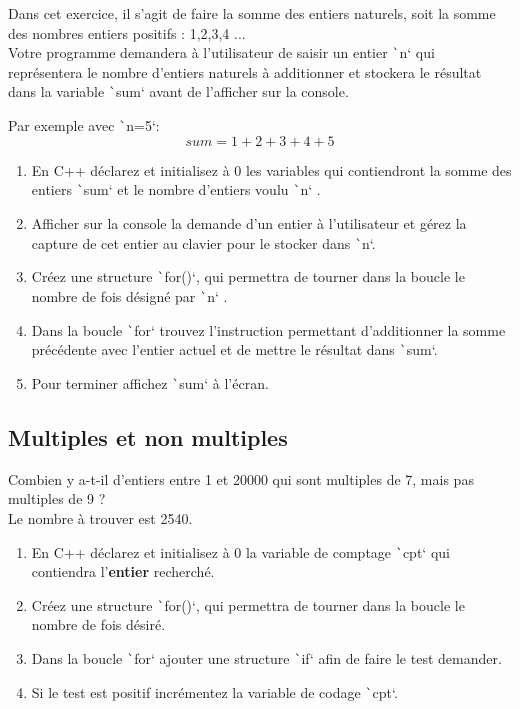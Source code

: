 \documentclass[10pt]{article}
\begin{document}
Dans cet exercice, il s'agit de faire la somme des entiers naturels, soit la somme des nombres entiers positifs : 1,2,3,4 ...\\
Votre programme demandera à l'utilisateur de saisir un entier \texttt`n` qui représentera le nombre d'entiers naturels à additionner et stockera le résultat dans la variable \texttt`sum` avant de l'afficher sur la console. 

\smallskip
Par exemple avec \texttt`n=5`:\\
$$sum=1+2+3+4+5$$

\begin{enumerate}
    \item En C++ déclarez et initialisez à 0 les variables qui contiendront la somme des entiers \texttt`sum` et le nombre d'entiers voulu \texttt`n` .
    \item Afficher sur la console la demande d'un entier à l'utilisateur et gérez la capture de cet entier au clavier pour le stocker dans \texttt`n`.
    \item Créez une structure \texttt`for()`, qui permettra de tourner dans la boucle le nombre de fois désigné par \texttt`n` .
    \item Dans la boucle \texttt`for` trouvez l'instruction permettant d'additionner la somme précédente avec l'entier actuel et de mettre le résultat dans \texttt`sum`.
    \item Pour terminer affichez \texttt`sum` à l'écran.
\end{enumerate}


\subsection{Multiples et non multiples}

Combien y a-t-il d'entiers entre 1 et 20000 qui sont multiples de 7, mais pas multiples de 9 ?\\
Le nombre à trouver est 2540.

\begin{enumerate}
    \item En C++ déclarez et initialisez à 0 la variable de comptage \texttt`cpt`  qui contiendra l'\textbf{entier} recherché.
    \item Créez une structure \texttt`for()`, qui permettra de tourner dans la boucle le nombre de fois désiré.
    \item Dans la boucle \texttt`for` ajouter une structure \texttt`if` afin de faire le test demander.
    \item Si le test est positif incrémentez la variable de codage \texttt`cpt`.
\end{enumerate}
\end{document}
